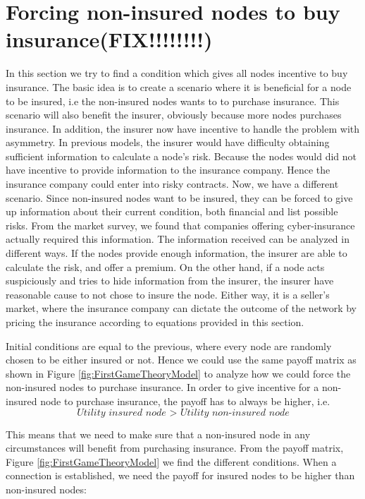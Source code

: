 \section{Forcing non-insured nodes to buy insurance(FIX!!!!!!!!)}

In this section we try to find a condition which gives all nodes incentive to buy insurance. The basic idea is to create a scenario where it is beneficial for a node to be insured, i.e the non-insured nodes wants to to purchase insurance. 
This scenario will also benefit the insurer, obviously because more nodes purchases insurance. In addition, the insurer now have incentive to handle the problem with asymmetry. In previous models, the insurer would have difficulty obtaining sufficient information to calculate a node's risk. Because the nodes would did not have incentive to provide information to the insurance company. Hence the insurance company could enter into risky contracts. Now, we have a different scenario. Since non-insured nodes want to be insured, they can be forced to give up information about their current condition, both financial and list possible risks. From the market survey, we found that companies offering cyber-insurance actually required this information. The information received can be analyzed in different ways. If the nodes provide enough information, the insurer are able to calculate the risk, and offer a premium. On the other hand, if a node acts suspiciously and tries to hide information from the insurer, the insurer have reasonable cause to not chose to insure the node. Either way, it is a seller's market, where the insurance company can dictate the outcome of the network by pricing the insurance according to equations provided in this section.  

Initial conditions are equal to the previous, where every node are randomly chosen to be either insured or not. Hence we could use the same payoff matrix as shown in Figure \ref{fig:FirstGameTheoryModel} to analyze how we could force the non-insured nodes to purchase insurance. In order to give incentive for a non-insured node to purchase insurance, the payoff has to always be higher, i.e. 
\begin{equation}
\textit{Utility insured node > Utility non-insured node}
\end{equation}



This means that we need to make sure that a non-insured node in any circumstances will benefit from purchasing insurance. From the payoff matrix, Figure \ref{fig:FirstGameTheoryModel} we find the different conditions. When a connection is established, we need the payoff for insured nodes to be higher than non-insured nodes: 


